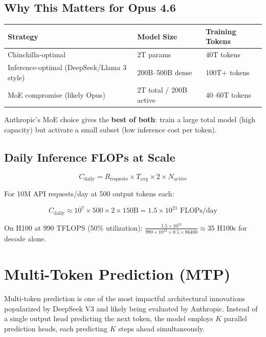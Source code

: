 \documentclass[11pt,a4paper]{article}
\begin{document}
\subsection{Why This Matters for Opus 4.6}

\begin{center}
\begin{tabular}{lll}
\toprule
\textbf{Strategy} & \textbf{Model Size} & \textbf{Training Tokens} \\
\midrule
Chinchilla-optimal & 2T params & 40T tokens \\
Inference-optimal (DeepSeek/Llama 3 style) & 200B--500B dense & 100T+ tokens \\
MoE compromise (likely Opus) & 2T total / 200B active & 40--60T tokens \\
\bottomrule
\end{tabular}
\end{center}

Anthropic's MoE choice gives the \textbf{best of both}: train a large total model (high capacity) but activate a small subset (low inference cost per token).

\subsection{Daily Inference FLOPs at Scale}

$$C_{\text{daily}} = R_{\text{requests}} \times T_{\text{avg}} \times 2 \times N_{\text{active}}$$

For 10M API requests/day at 500 output tokens each:

$$C_{\text{daily}} \approx 10^7 \times 500 \times 2 \times 150\text{B} = 1.5 \times 10^{21} \text{ FLOPs/day}$$

On H100 at 990 TFLOPS (50\% utilization): $\frac{1.5 \times 10^{21}}{990 \times 10^{12} \times 0.5 \times 86400} \approx 35$ H100s for decode alone.

\section{Multi-Token Prediction (MTP)}

Multi-token prediction is one of the most impactful architectural innovations popularized by DeepSeek V3 and likely being evaluated by Anthropic. Instead of a single output head predicting the next token, the model employs $K$ parallel prediction heads, each predicting $K$ steps ahead simultaneously.
\end{document}
